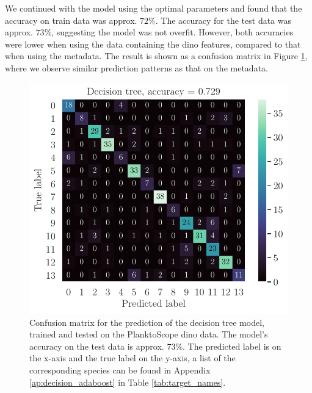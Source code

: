 We continued with the model using the optimal parameters and found that the accuracy on train data was approx. $72\%$. The accuracy for the test data was approx. $73\%$, suggesting the model was not overfit. However, both accuracies were lower when using the data containing the dino features, compared to that when using the metadata. The result is shown as a confusion matrix in Figure \ref{fig:cm_tree_dino}, where we observe similar prediction patterns as that on the metadata.

\begin{figure}
    \centering
    \includegraphics[width=\linewidth]{latex/figures/cm_tree_planktoscope_dino_labeled.pdf}
    \caption{Confusion matrix for the prediction of the decision tree model, trained and tested on the PlanktoScope dino data. The model's accuracy on the test data is approx. $73\%$. The predicted label is on the x-axis and the true label on the y-axis, a list of the corresponding species can be found in Appendix \ref{ap:decision_adaboost} in Table \ref{tab:target_names}.}
    \label{fig:cm_tree_dino}
\end{figure}

